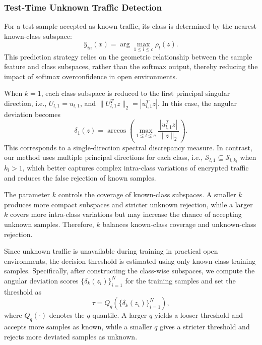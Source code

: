 \documentclass{SCIS2026}
\begin{document}
\subsubsection{Test-Time Unknown Traffic Detection}

For a test sample accepted as known traffic, its class is determined by the nearest known-class subspace:
\begin{equation}
	\hat{y}_{in}(x)
	=
	\arg\max_{1\leq l\leq c}\rho_l(z).
	\label{eq:known_class_prediction}
\end{equation}
This prediction strategy relies on the geometric relationship between the sample feature and class subspaces, rather than the softmax output, thereby reducing the impact of softmax overconfidence in open environments.

When $k=1$, each class subspace is reduced to the first principal singular direction, i.e., $U_{l,1}=u_{l,1}$, and $\|U_{l,1}^{T}z\|_2=|u_{l,1}^{T}z|$. In this case, the angular deviation becomes
\begin{equation}
	\delta_1(z)
	=
	\arccos
	\left(
	\max_{1\leq l\leq c}
	\frac{|u_{l,1}^{T}z|}{\|z\|_2}
	\right).
	\label{eq:single_direction_deviation}
\end{equation}
This corresponds to a single-direction spectral discrepancy measure. In contrast, our method uses multiple principal directions for each class, i.e., $\mathcal{S}_{l,1}\subseteq\mathcal{S}_{l,k_l}$ when $k_l>1$, which better captures complex intra-class variations of encrypted traffic and reduces the false rejection of known samples.

The parameter $k$ controls the coverage of known-class subspaces. A smaller $k$ produces more compact subspaces and stricter unknown rejection, while a larger $k$ covers more intra-class variations but may increase the chance of accepting unknown samples. Therefore, $k$ balances known-class coverage and unknown-class rejection.

Since unknown traffic is unavailable during training in practical open environments, the decision threshold is estimated using only known-class training samples. Specifically, after constructing the class-wise subspaces, we compute the angular deviation scores $\{\delta_k(z_i)\}_{i=1}^{N}$ for the training samples and set the threshold as
\begin{equation}
	\tau
	=
	Q_q\left(\{\delta_k(z_i)\}_{i=1}^{N}\right),
	\label{eq:threshold}
\end{equation}
where $Q_q(\cdot)$ denotes the $q$-quantile. A larger $q$ yields a looser threshold and accepts more samples as known, while a smaller $q$ gives a stricter threshold and rejects more deviated samples as unknown.
\end{document}
